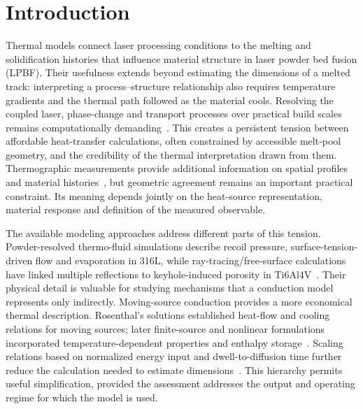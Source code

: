 \section{Introduction}
\label{sec:introduction}

Thermal models connect laser processing conditions to the melting and solidification histories that influence material structure in laser powder bed fusion (LPBF). Their usefulness extends beyond estimating the dimensions of a melted track: interpreting a process--structure relationship also requires temperature gradients and the thermal path followed as the material cools. Resolving the coupled laser, phase-change and transport processes over practical build scales remains computationally demanding~\cite{king2015}. This creates a persistent tension between affordable heat-transfer calculations, often constrained by accessible melt-pool geometry, and the credibility of the thermal interpretation drawn from them. Thermographic measurements provide additional information on spatial profiles and material histories~\cite{hooper2018,myers2023}, but geometric agreement remains an important practical constraint. Its meaning depends jointly on the heat-source representation, material response and definition of the measured observable.

The available modeling approaches address different parts of this tension. Powder-resolved thermo-fluid simulations describe recoil pressure, surface-tension-driven flow and evaporation in 316L, while ray-tracing/free-surface calculations have linked multiple reflections to keyhole-induced porosity in Ti6Al4V~\cite{khairallah2016,bayat2019}. Their physical detail is valuable for studying mechanisms that a conduction model represents only indirectly. Moving-source conduction provides a more economical thermal description. Rosenthal's solutions established heat-flow and cooling relations for moving sources; later finite-source and nonlinear formulations incorporated temperature-dependent properties and enthalpy storage~\cite{rosenthal1946,vanelsen2007}. Scaling relations based on normalized energy input and dwell-to-diffusion time further reduce the calculation needed to estimate dimensions~\cite{rubenchik2018}. This hierarchy permits useful simplification, provided the assessment addresses the output and operating regime for which the model is used.

